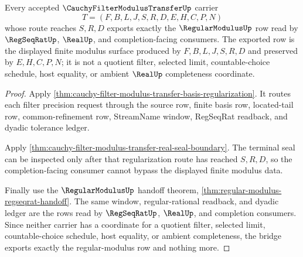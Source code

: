 \begin{theorem}
\label{thm:cauchy-filter-modulus-transfer-regular-modulus-bridge}
Every accepted $\CauchyFilterModulusTransferUp$ carrier
$$
T=(F,B,L,J,S,R,D,E,H,C,P,N)
$$
whose route reaches $S,R,D$ exports exactly the $\RegularModulusUp$ row read by $\RegSeqRatUp$, $\RealUp$, and completion-facing consumers. The exported row is the displayed finite modulus surface produced by $F,B,L,J,S,R,D$ and preserved by $E,H,C,P,N$; it is not a quotient filter, selected limit, countable-choice schedule, host equality, or ambient $\RealUp$ completeness coordinate.
\end{theorem}
\begin{proof}
Apply \autoref{thm:cauchy-filter-modulus-transfer-basis-regularization}. It routes each filter precision request through the source row, finite basis row, located-tail row, common-refinement row, StreamName window, RegSeqRat readback, and dyadic tolerance ledger.

Apply \autoref{thm:cauchy-filter-modulus-transfer-real-seal-boundary}. The terminal seal can be inspected only after that regularization route has reached $S,R,D$, so the completion-facing consumer cannot bypass the displayed finite modulus data.

Finally use the $\RegularModulusUp$ handoff theorem, \autoref{thm:regular-modulus-regseqrat-handoff}. The same window, regular-rational readback, and dyadic ledger are the rows read by $\RegSeqRatUp$, $\RealUp$, and completion consumers. Since neither carrier has a coordinate for a quotient filter, selected limit, countable-choice schedule, host equality, or ambient completeness, the bridge exports exactly the regular-modulus row and nothing more.
\end{proof}

